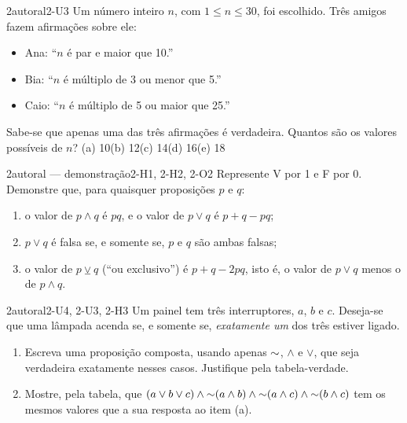 \begin{questao}{2}{autoral}{2-U3}\label{u2:q8}
Um número inteiro $n$, com $1\le n\le 30$, foi escolhido. Três amigos fazem afirmações sobre ele:
\begin{itemize}
  \item Ana: \enquote{$n$ é par e maior que 10.}
  \item Bia: \enquote{$n$ é múltiplo de 3 ou menor que 5.}
  \item Caio: \enquote{$n$ é múltiplo de 5 ou maior que 25.}
\end{itemize}
Sabe-se que apenas uma das três afirmações é verdadeira. Quantos são os valores possíveis de $n$?\quad
(a) 10\quad (b) 12\quad (c) 14\quad (d) 16\quad (e) 18
\end{questao}

\begin{questao}{2}{autoral — demonstração}{2-H1, 2-H2, 2-O2}\label{u2:q9}
Represente V por 1 e F por 0. Demonstre que, para quaisquer proposições $p$ e $q$:
\begin{enumerate}[label=\alph*)]
  \item o valor de $p\wedge q$ é $pq$, e o valor de $p\vee q$ é $p+q-pq$;
  \item $p\vee q$ é falsa se, e somente se, $p$ e $q$ são ambas falsas;
  \item o valor de $p\veebar q$ (\enquote{ou exclusivo}) é $p+q-2pq$, isto é, o valor de $p\vee q$ menos o de $p\wedge q$.
\end{enumerate}
\end{questao}

\begin{questao}{2}{autoral}{2-U4, 2-U3, 2-H3}\label{u2:q10}
Um painel tem três interruptores, $a$, $b$ e $c$. Deseja-se que uma lâmpada acenda se, e somente se, \emph{exatamente um} dos três estiver ligado.
\begin{enumerate}[label=\alph*)]
  \item Escreva uma proposição composta, usando apenas ${{\sim}}$, $\wedge$ e $\vee$, que seja verdadeira exatamente nesses casos. Justifique pela tabela-verdade.
  \item Mostre, pela tabela, que $(a\vee b\vee c)\wedge{{\sim}}(a\wedge b)\wedge{{\sim}}(a\wedge c)\wedge{{\sim}}(b\wedge c)$ tem os mesmos valores que a sua resposta ao item (a).
\end{enumerate}
\end{questao}

